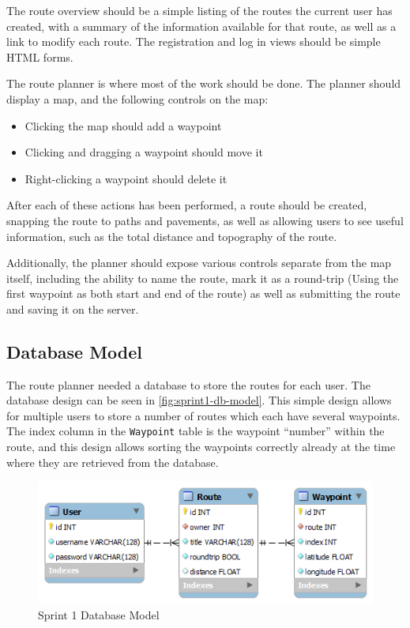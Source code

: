 The route overview should be a simple listing of the routes the current user has created, with a summary of the information available for that route, as well as a link to modify each route. The registration and log in views should be simple \ac{HTML} forms.

The route planner is where most of the work should be done. The planner should display a map, and the following controls on the map:

\begin{itemize}
 \item Clicking the map should add a waypoint
 \item Clicking and dragging a waypoint should move it
 \item Right-clicking a waypoint should delete it
\end{itemize}

After each of these actions has been performed, a route should be created, snapping the route to paths and pavements, as well as allowing users to see useful information, such as the total distance and topography of the route.

Additionally, the planner should expose various controls separate from the map itself, including the ability to name the route, mark it as a round-trip (Using the first waypoint as both start and end of the route) as well as submitting the route and saving it on the server.

\subsection{Database Model}

The route planner needed a database to store the routes for each user. The database design can be seen in \autoref{fig:sprint1-db-model}. This simple design allows for multiple users to store a number of routes which each have several waypoints. The index column in the \texttt{Waypoint} table is the waypoint ``number'' within the route, and this design allows sorting the waypoints correctly already at the time where they are retrieved from the database.

\begin{figure}[ht]
 \centering
 \includegraphics[scale=0.5]{img/sprint1db.png}
 \caption{Sprint 1 Database Model}
 \label{fig:sprint1-db-model}
\end{figure}

